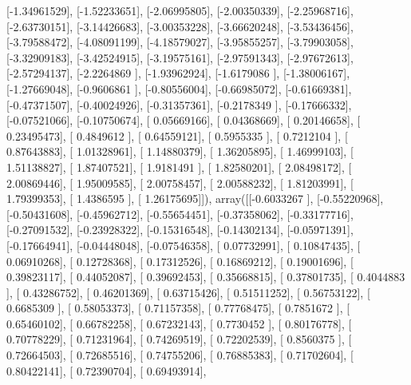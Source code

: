 \documentclass{article}
\begin{document}
       [-1.34961529],
       [-1.52233651],
       [-2.06995805],
       [-2.00350339],
       [-2.25968716],
       [-2.63730151],
       [-3.14426683],
       [-3.00353228],
       [-3.66620248],
       [-3.53436456],
       [-3.79588472],
       [-4.08091199],
       [-4.18579027],
       [-3.95855257],
       [-3.79903058],
       [-3.32909183],
       [-3.42524915],
       [-3.19575161],
       [-2.97591343],
       [-2.97672613],
       [-2.57294137],
       [-2.2264869 ],
       [-1.93962924],
       [-1.6179086 ],
       [-1.38006167],
       [-1.27669048],
       [-0.9606861 ],
       [-0.80556004],
       [-0.66985072],
       [-0.61669381],
       [-0.47371507],
       [-0.40024926],
       [-0.31357361],
       [-0.2178349 ],
       [-0.17666332],
       [-0.07521066],
       [-0.10750674],
       [ 0.05669166],
       [ 0.04368669],
       [ 0.20146658],
       [ 0.23495473],
       [ 0.4849612 ],
       [ 0.64559121],
       [ 0.5955335 ],
       [ 0.7212104 ],
       [ 0.87643883],
       [ 1.01328961],
       [ 1.14880379],
       [ 1.36205895],
       [ 1.46999103],
       [ 1.51138827],
       [ 1.87407521],
       [ 1.9181491 ],
       [ 1.82580201],
       [ 2.08498172],
       [ 2.00869446],
       [ 1.95009585],
       [ 2.00758457],
       [ 2.00588232],
       [ 1.81203991],
       [ 1.79399353],
       [ 1.4386595 ],
       [ 1.26175695]]), array([[-0.6033267 ],
       [-0.55220968],
       [-0.50431608],
       [-0.45962712],
       [-0.55654451],
       [-0.37358062],
       [-0.33177716],
       [-0.27091532],
       [-0.23928322],
       [-0.15316548],
       [-0.14302134],
       [-0.05971391],
       [-0.17664941],
       [-0.04448048],
       [-0.07546358],
       [ 0.07732991],
       [ 0.10847435],
       [ 0.06910268],
       [ 0.12728368],
       [ 0.17312526],
       [ 0.16869212],
       [ 0.19001696],
       [ 0.39823117],
       [ 0.44052087],
       [ 0.39692453],
       [ 0.35668815],
       [ 0.37801735],
       [ 0.4044883 ],
       [ 0.43286752],
       [ 0.46201369],
       [ 0.63715426],
       [ 0.51511252],
       [ 0.56753122],
       [ 0.6685309 ],
       [ 0.58053373],
       [ 0.71157358],
       [ 0.77768475],
       [ 0.7851672 ],
       [ 0.65460102],
       [ 0.66782258],
       [ 0.67232143],
       [ 0.7730452 ],
       [ 0.80176778],
       [ 0.70778229],
       [ 0.71231964],
       [ 0.74269519],
       [ 0.72202539],
       [ 0.8560375 ],
       [ 0.72664503],
       [ 0.72685516],
       [ 0.74755206],
       [ 0.76885383],
       [ 0.71702604],
       [ 0.80422141],
       [ 0.72390704],
       [ 0.69493914],
\end{document}
